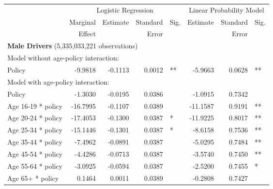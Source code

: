 
\begin{table}%
\centering 
\begin{tabular}{l r r r l r r l} 

\hline 
 
 & \multicolumn{4}{c}{Logistic Regression}  & \multicolumn{3}{c}{Linear Probability Model} \\ 

 \cmidrule(lr){2-5}\cmidrule(lr){6-8} 
 & Marginal & Estimate & Standard & Sig. & Estimate & Standard & Sig. \\ 
 &   Effect &          &  Error   &      &          &  Error   &     \\ 

\hline 
 
\multicolumn{7}{l}{\textbf{Male Drivers} (5,335,033,221 observations)} \\ 

\hline
\multicolumn{7}{l}{Model without age-policy interaction: } \\ 
Policy                   &  -9.9818       &  -0.1113        &  0.0012       &   **       &  -5.9663        &  0.0628       &   **       \\ 
\hline
\multicolumn{7}{l}{Model with age-policy interaction: } \\ 
Policy                   &  -1.3030       &  -0.0195        &  0.0386       &            &  -1.0915        &  0.7342       &            \\ 
Age 16-19 * policy   &  -16.7995       &  -0.1107        &  0.0389       &            &  -11.1587        &  0.9191       &   **       \\ 
Age 20-24 * policy   &  -17.4053       &  -0.1300        &  0.0387       &    *       &  -11.9225        &  0.8017       &   **       \\ 
Age 25-34 * policy   &  -15.1446       &  -0.1301        &  0.0387       &    *       &  -8.6158        &  0.7536       &   **       \\ 
Age 35-44 * policy   &  -7.4962       &  -0.0891        &  0.0387       &            &  -5.0295        &  0.7484       &   **       \\ 
Age 45-54 * policy   &  -4.4286       &  -0.0713        &  0.0387       &            &  -3.5740        &  0.7450       &   **       \\ 
Age 55-64 * policy   &  -3.0925       &  -0.0594        &  0.0387       &            &  -2.5200        &  0.7455       &    *       \\ 
Age 65+ * policy   &  0.1464       &  0.0011        &  0.0389       &            &  -0.2808        &  0.7427       &            \\ 


\end{tabular}
\end{table}
